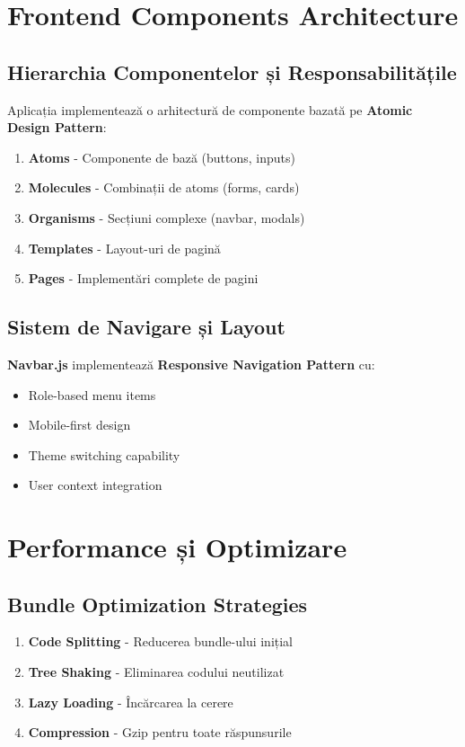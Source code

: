 \documentclass[11pt,a4paper]{article}
\begin{document}
\section{Frontend Components Architecture}

\subsection{Hierarchia Componentelor și Responsabilitățile}

Aplicația implementează o arhitectură de componente bazată pe \textbf{Atomic Design Pattern}:

\begin{enumerate}
    \item \textbf{Atoms} - Componente de bază (buttons, inputs)
    \item \textbf{Molecules} - Combinații de atoms (forms, cards)
    \item \textbf{Organisms} - Secțiuni complexe (navbar, modals)
    \item \textbf{Templates} - Layout-uri de pagină
    \item \textbf{Pages} - Implementări complete de pagini
\end{enumerate}

\subsection{Sistem de Navigare și Layout}

\textbf{Navbar.js} implementează \textbf{Responsive Navigation Pattern} cu:
\begin{itemize}
    \item Role-based menu items
    \item Mobile-first design
    \item Theme switching capability
    \item User context integration
\end{itemize}

\section{Performance și Optimizare}

\subsection{Bundle Optimization Strategies}

\begin{enumerate}
    \item \textbf{Code Splitting} - Reducerea bundle-ului inițial
    \item \textbf{Tree Shaking} - Eliminarea codului neutilizat
    \item \textbf{Lazy Loading} - Încărcarea la cerere
    \item \textbf{Compression} - Gzip pentru toate răspunsurile
\end{enumerate}
\end{document}
